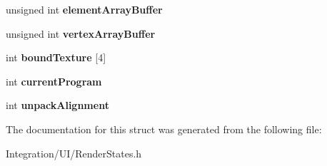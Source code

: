 \begin{DoxyCompactItemize}
\item 
\hypertarget{struct_render_states_a1051e8303f7175ca335f7276b1e7e41a}{unsigned int {\bfseries element\-Array\-Buffer}}\label{struct_render_states_a1051e8303f7175ca335f7276b1e7e41a}

\item 
\hypertarget{struct_render_states_a288f0d960627c83f3ac6318f2d689aca}{unsigned int {\bfseries vertex\-Array\-Buffer}}\label{struct_render_states_a288f0d960627c83f3ac6318f2d689aca}

\item 
\hypertarget{struct_render_states_a006e0d5c355695955a9ddef85846aa80}{int {\bfseries bound\-Texture} \mbox{[}4\mbox{]}}\label{struct_render_states_a006e0d5c355695955a9ddef85846aa80}

\item 
\hypertarget{struct_render_states_af269015f238dbdfd02643695f16cc749}{int {\bfseries current\-Program}}\label{struct_render_states_af269015f238dbdfd02643695f16cc749}

\item 
\hypertarget{struct_render_states_a8f8e59b92445cb2e7787be6734167c8d}{int {\bfseries unpack\-Alignment}}\label{struct_render_states_a8f8e59b92445cb2e7787be6734167c8d}

\end{DoxyCompactItemize}


The documentation for this struct was generated from the following file\-:\begin{DoxyCompactItemize}
\item 
Integration/\-U\-I/Render\-States.\-h\end{DoxyCompactItemize}
